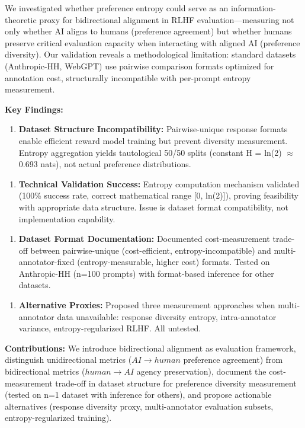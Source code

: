 
We investigated whether preference entropy could serve as an information-theoretic proxy for bidirectional alignment in RLHF evaluation---measuring not only whether AI aligns to humans (preference agreement) but whether humans preserve critical evaluation capacity when interacting with aligned AI (preference diversity). Our validation reveals a methodological limitation: standard datasets (Anthropic-HH, WebGPT) use pairwise comparison formats optimized for annotation cost, structurally incompatible with per-prompt entropy measurement.

\textbf{Key Findings:}

\begin{enumerate}
\item \textbf{Dataset Structure Incompatibility:} Pairwise-unique response formats enable efficient reward model training but prevent diversity measurement. Entropy aggregation yields tautological 50/50 splits (constant H = ln(2) $\approx$ 0.693 nats), not actual preference distributions.
\end{enumerate}

\begin{enumerate}
\item \textbf{Technical Validation Success:} Entropy computation mechanism validated (100\% success rate, correct mathematical range [0, ln(2)]), proving feasibility with appropriate data structure. Issue is dataset format compatibility, not implementation capability.
\end{enumerate}

\begin{enumerate}
\item \textbf{Dataset Format Documentation:} Documented cost-measurement trade-off between pairwise-unique (cost-efficient, entropy-incompatible) and multi-annotator-fixed (entropy-measurable, higher cost) formats. Tested on Anthropic-HH (n=100 prompts) with format-based inference for other datasets.
\end{enumerate}

\begin{enumerate}
\item \textbf{Alternative Proxies:} Proposed three measurement approaches when multi-annotator data unavailable: response diversity entropy, intra-annotator variance, entropy-regularized RLHF. All untested.
\end{enumerate}

\textbf{Contributions:} We introduce bidirectional alignment as evaluation framework, distinguish unidirectional metrics ($AI\rightarrow human$ preference agreement) from bidirectional metrics ($human\rightarrow AI$ agency preservation), document the cost-measurement trade-off in dataset structure for preference diversity measurement (tested on n=1 dataset with inference for others), and propose actionable alternatives (response diversity proxy, multi-annotator evaluation subsets, entropy-regularized training).

